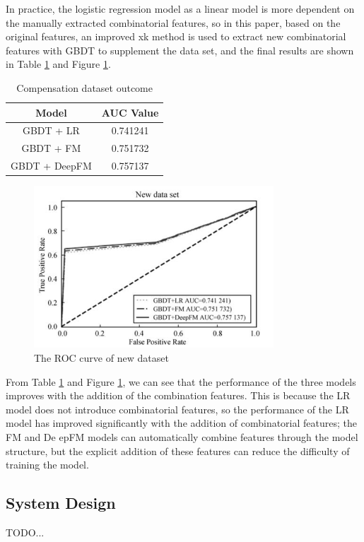 \documentclass[11pt,en]{elegantpaper}
\begin{document}
In practice, the logistic regression model as a linear model is more dependent on the manually extracted combinatorial features, so in this paper, based on the original features, an improved xk method is used to extract new combinatorial features with GBDT to supplement the data set, and the final results are shown in Table \ref{roc2tb} and Figure \ref{roc2fg}.

\begin{table}
	\centering
	\caption{Compensation dataset outcome}
	\label{roc2tb}
	\begin{tabular}{|c|c|}
		\hline Model & AUC Value \\
		\hline GBDT + LR & 0.741241 \\
		\hline GBDT + FM & 0.751732 \\
		\hline GBDT + DeepFM & 0.757137 \\
		\hline
	\end{tabular}
\end{table}

\begin{figure}[h]
	\centering
	\includegraphics[width=0.8\textwidth]{./image/roc2fg.png}
	\caption{The ROC curve of new dataset}
	\label{roc2fg}
\end{figure}

From Table \ref{roc2tb} and Figure \ref{roc2fg}, we can see that the performance of the three models improves with the addition of the combination features. This is because the LR model does not introduce combinatorial features, so the performance of the LR model has improved significantly with the addition of combinatorial features; the FM and De epFM models can automatically combine features through the model structure, but the explicit addition of these features can reduce the difficulty of training the model.


\subsection{System Design}
TODO...
\end{document}
